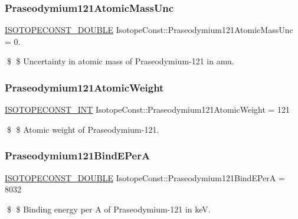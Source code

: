\subsubsection{\texorpdfstring{Praseodymium121\+Atomic\+Mass\+Unc}{Praseodymium121AtomicMassUnc}}
{\footnotesize\ttfamily \mbox{\hyperlink{group___isotope_const-_macros_ga8f45a7272ce02c0b4c65c44636ed719a}{I\+S\+O\+T\+O\+P\+E\+C\+O\+N\+S\+T\+\_\+\+D\+O\+U\+B\+LE}} Isotope\+Const\+::\+Praseodymium121\+Atomic\+Mass\+Unc = 0.}

\$ \$ Uncertainty in atomic mass of Praseodymium-\/121 in amu. \mbox{\label{group___isotope_const-_praseodymium-_pr121_ga371ccf59a086c1298dbf2615e832c43b}} 
\subsubsection{\texorpdfstring{Praseodymium121\+Atomic\+Weight}{Praseodymium121AtomicWeight}}
{\footnotesize\ttfamily \mbox{\hyperlink{group___isotope_const-_macros_ga5f18360b3e99483a35c32d789e62621c}{I\+S\+O\+T\+O\+P\+E\+C\+O\+N\+S\+T\+\_\+\+I\+NT}} Isotope\+Const\+::\+Praseodymium121\+Atomic\+Weight = 121}

\$ \$ Atomic weight of Praseodymium-\/121. \mbox{\label{group___isotope_const-_praseodymium-_pr121_gade50a6da6167cc1e8698e513d5d57027}} 
\subsubsection{\texorpdfstring{Praseodymium121\+Bind\+E\+PerA}{Praseodymium121BindEPerA}}
{\footnotesize\ttfamily \mbox{\hyperlink{group___isotope_const-_macros_ga8f45a7272ce02c0b4c65c44636ed719a}{I\+S\+O\+T\+O\+P\+E\+C\+O\+N\+S\+T\+\_\+\+D\+O\+U\+B\+LE}} Isotope\+Const\+::\+Praseodymium121\+Bind\+E\+PerA = 8032}

\$ \$ Binding energy per A of Praseodymium-\/121 in keV. \mbox{\label{group___isotope_const-_praseodymium-_pr121_gafa40f1db0c3417d1410114f5d00920b7}} 
